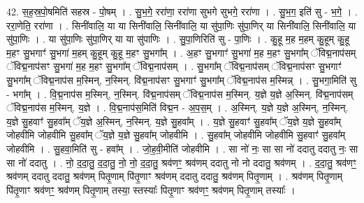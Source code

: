 \documentclass[17pt]{extarticle}
\begin{document}
42. स॒ह॒स्र॒पो॒षमिति॑ सहस्र - पो॒षम् । . सु॒भ॒गे॒ ररा॑णा॒ ररा॑णा सुभगे सुभगे॒ ररा॑णा । . सु॒भ॒ग॒ इति॑ सु - भ॒गे॒ । . ररा॒णेति॒ ररा॑णा । . सिनी॑वालि॒ या या सिनी॑वालि॒ सिनी॑वालि॒ या सु॑पा॒णिः सु॑पा॒णिर् या सिनी॑वालि॒ सिनी॑वालि॒ या सु॑पा॒णिः । . या सु॑पा॒णिः सु॑पा॒णिर् या या सु॑पाणिः । . सु॒पा॒णिरिति॑ सु - पा॒णिः । . कु॒हू म॒ह म॒हम् कु॒हूम् कु॒हू म॒हꣳ सु॒भगाꣳ॑ सु॒भगा॑ म॒हम् कु॒हूम् कु॒हू म॒हꣳ सु॒भगा᳚म् । . अ॒हꣳ सु॒भगाꣳ॑ सु॒भगा॑ म॒ह म॒हꣳ सु॒भगा᳚म् ॅविद्म॒नाप॑सम् ॅविद्म॒नाप॑सꣳ सु॒भगा॑ म॒ह म॒हꣳ सु॒भगा᳚म् ॅविद्म॒नाप॑सम् । . सु॒भगा᳚म् ॅविद्म॒नाप॑सम् ॅविद्म॒नाप॑सꣳ सु॒भगाꣳ॑ सु॒भगा᳚म् ॅविद्म॒नाप॑स म॒स्मिन्, न॒स्मिन्. वि॑द्म॒नाप॑सꣳ सु॒भगाꣳ॑ सु॒भगा᳚म् ॅविद्म॒नाप॑स म॒स्मिन्न् । . सु॒भगा॒मिति॑ सु - भगा᳚म् । . वि॒द्म॒नाप॑स म॒स्मिन्, न॒स्मिन्. वि॑द्म॒नाप॑सम् ॅविद्म॒नाप॑स म॒स्मिन्. य॒ज्ञे य॒ज्ञे अ॒स्मिन्. वि॑द्म॒नाप॑सम् ॅविद्म॒नाप॑स म॒स्मिन्. य॒ज्ञे । . वि॒द्म॒नाप॑स॒मिति॑ विद्म॒न - अ॒प॒स॒म् । . अ॒स्मिन्. य॒ज्ञे य॒ज्ञे अ॒स्मिन्, न॒स्मिन्. य॒ज्ञे सु॒हवाꣳ॑ सु॒हवा᳚म् ॅय॒ज्ञे अ॒स्मिन्, न॒स्मिन्. य॒ज्ञे सु॒हवा᳚म् । . य॒ज्ञे सु॒हवाꣳ॑ सु॒हवा᳚म् ॅय॒ज्ञे य॒ज्ञे सु॒हवा᳚म् जोहवीमि जोहवीमि सु॒हवा᳚म् ॅय॒ज्ञे य॒ज्ञे सु॒हवा᳚म् जोहवीमि । . सु॒हवा᳚म् जोहवीमि जोहवीमि सु॒हवाꣳ॑ सु॒हवा᳚म् जोहवीमि । . सु॒हवा॒मिति॑ सु - हवा᳚म् । . जो॒ह॒वी॒मीति॑ जोहवीमि । . सा नो॑ नः॒ सा सा नो॑ ददातु ददातु नः॒ सा सा नो॑ ददातु । . नो॒ द॒दा॒तु॒ द॒दा॒तु॒ नो॒ नो॒ द॒दा॒तु॒ श्रव॑णꣳ॒॒ श्रव॑णम् ददातु नो नो ददातु॒ श्रव॑णम् । . द॒दा॒तु॒ श्रव॑णꣳ॒॒ श्रव॑णम् ददातु ददातु॒ श्रव॑णम् पितृ॒णाम् पि॑तृ॒णाꣳ श्रव॑णम् ददातु ददातु॒ श्रव॑णम् पितृ॒णाम् । . श्रव॑णम् पितृ॒णाम् पि॑तृ॒णाꣳ श्रव॑णꣳ॒॒ श्रव॑णम् पितृ॒णाम् तस्या॒ स्तस्याः᳚ पितृ॒णाꣳ श्रव॑णꣳ॒॒ श्रव॑णम् पितृ॒णाम् तस्याः᳚ । \newline
\end{document}
